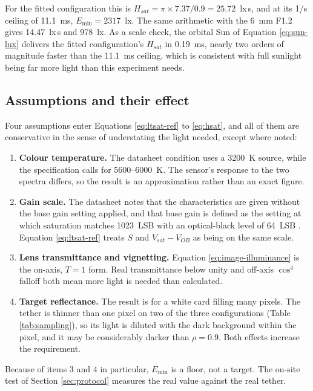 For the fitted configuration this is $H_{sat} = \pi \times 7.37 / 0.9 = 25.72$~lx\,s, and at its 1\textdegree/s ceiling of 11.1~ms, $E_{\min} = 2317$~lx. The same arithmetic with the 6~mm F1.2 gives 14.47~lx\,s and 978~lx. As a scale check, the orbital Sun of Equation \ref{eq:sun-lux} delivers the fitted configuration's $H_{sat}$ in 0.19~ms, nearly two orders of magnitude faster than the 11.1~ms ceiling, which is consistent with full sunlight being far more light than this experiment needs.

\subsection{Assumptions and their effect}

Four assumptions enter Equations \ref{eq:ltsat-ref} to \ref{eq:hsat}, and all of them are conservative in the sense of understating the light needed, except where noted:

\begin{enumerate}
    \item \textbf{Colour temperature.} The datasheet condition uses a 3200~K source, while the specification calls for 5600--6000~K. The sensor's response to the two spectra differs, so the result is an approximation rather than an exact figure.
    \item \textbf{Gain scale.} The datasheet notes that the characteristics are given without the base gain setting applied, and that base gain is defined as the setting at which saturation matches 1023~LSB with an optical-black level of 64~LSB \cite{sony_imx477_datasheet}. Equation \ref{eq:ltsat-ref} treats $S$ and $V_{sat}-V_{OB}$ as being on the same scale.
    \item \textbf{Lens transmittance and vignetting.} Equation \ref{eq:image-illuminance} is the on-axis, $T = 1$ form. Real transmittance below unity and off-axis $\cos^4$ falloff both mean more light is needed than calculated.
    \item \textbf{Target reflectance.} The result is for a white card filling many pixels. The tether is thinner than one pixel on two of the three configurations (Table \ref{tab:sampling}), so its light is diluted with the dark background within the pixel, and it may be considerably darker than $\rho = 0.9$. Both effects increase the requirement.
\end{enumerate}

Because of items 3 and 4 in particular, $E_{\min}$ is a floor, not a target. The on-site test of Section \ref{sec:protocol} measures the real value against the real tether.

